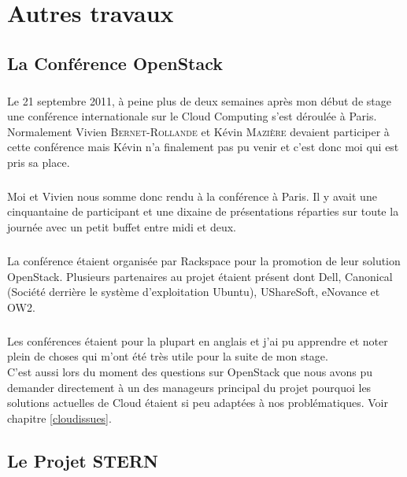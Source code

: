 \chapter{Autres travaux}

\section{La Conférence OpenStack}
\paragraph*{}
Le 21 septembre 2011, à peine plus de deux semaines après mon début de stage une conférence internationale sur le Cloud Computing s'est déroulée à Paris.
Normalement Vivien \textsc{Bernet-Rollande} et Kévin \textsc{Mazière} devaient participer à cette conférence mais Kévin n'a finalement pas pu venir et c'est donc
moi qui est pris sa place.

\paragraph*{}
Moi et Vivien nous somme donc rendu à la conférence à Paris.
Il y avait une cinquantaine de participant et une dixaine de présentations réparties sur toute la journée avec un petit buffet entre midi et deux.

\paragraph*{}
La conférence étaient organisée par Rackspace pour la promotion de leur solution OpenStack. Plusieurs partenaires au projet étaient présent dont Dell, Canonical (Société derrière
le système d'exploitation Ubuntu), UShareSoft, eNovance et OW2.

\paragraph*{}
Les conférences étaient pour la plupart en anglais et j'ai pu apprendre et noter plein de choses qui m'ont été très utile
pour la suite de mon stage.\\
C'est aussi lors du moment des questions sur OpenStack que nous avons pu demander directement à un des manageurs principal du projet pourquoi les solutions actuelles de Cloud
étaient si peu adaptées à nos problématiques. Voir chapitre \ref{cloudissues}.


\section{Le Projet STERN}
